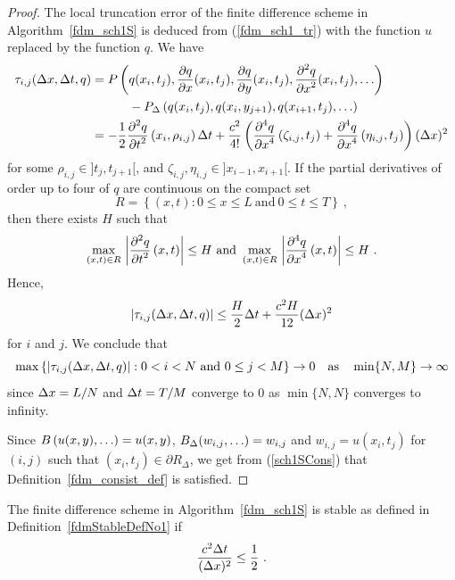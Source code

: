 \begin{proof}
The local truncation error of the finite difference scheme in
Algorithm~\ref{fdm_sch1S} is deduced from (\ref{fdm_sch1_tr}) with the
function $u$ replaced by the function $q$.  We have
\begin{align*}
\tau_{i,j}(\Delta{x},\Delta{t},q) &= 
P\left(q(x_i,t_j), \frac{\partial{q}}{\partial{x}}(x_i,t_j), \frac{\partial{q}}{\partial{y}}(x_i,t_j),
  \frac{\displaystyle \partial^{2}{q}} {\displaystyle \partial{x}^{2}}(x_i,t_j), \ldots \right) \\
&\qquad\quad
- P_\Delta\left(q(x_i,t_j), q(x_i,y_{j+1}), q(x_{i+1},t_j), \ldots\right) \\
&= -\frac{1}{2} \frac{\displaystyle \partial^{2}{q}} {\displaystyle \partial{t}^{2}}\left(x_i,\rho_{i,j}\right) \Delta{t}
+ \frac{c^2}{4!} \left( \frac{\displaystyle \partial^{4}{q}} {\displaystyle \partial{x}^{4}}\left(\zeta_{i,j},t_j\right)
+ \frac{\displaystyle \partial^{4}{q}} {\displaystyle \partial{x}^{4}}\left(\eta_{i,j},t_j\right) \right) (\Delta{x})^2
\end{align*}
for some $\rho_{i,j} \in ]t_j,t_{j+1}[$, and
$\zeta_{i,j}, \eta_{i,j} \in ]x_{i-1},x_{i+1}[$.  If the partial
derivatives of order up to four of $q$ are continuous on the compact set
\begin{equation} \label{fdm_sch1_dom}
R = \left\{ (x,t) : 0\leq x \leq L \ \text{and}\ 0 \leq t \leq T \right\} \ ,
\end{equation}
then there exists $H$ such that
\[
\max_{(x,t)\in R}\, \left|\frac{\displaystyle \partial^{2}{q}} {\displaystyle \partial{t}^{2}}\left(x,t\right) \right| \leq
H \ \text{and} \
\max_{(x,t)\in R}\, \left|\frac{\displaystyle \partial^{4}{q}} {\displaystyle \partial{x}^{4}}\left(x,t\right) \right| \leq
H \ .
\]
Hence,
\begin{equation}\label{fdm_sch1Trunc}
\left| \tau_{i,j}(\Delta{x},\Delta{t},q) \right | \leq
\frac{H}{2} \Delta{t} + \frac{c^2 H}{12} (\Delta{x})^2
\end{equation}
for $i$ and $j$.  We conclude that
\begin{equation} \label{sch1SCons}
\max \left\{ \left|\tau_{i,j}(\Delta{x},\Delta{t},q)\right| :
0<i<N \ \text{and} \ 0\leq j < M
\right\} \rightarrow 0 \quad \text{as} \quad
\min \{N, M\} \rightarrow \infty
\end{equation}
since $\Delta{x} = L/N$ and $\Delta{t} = T/M$ converge to $0$ as
$\min\{N,N\}$ converges to infinity.

Since $\displaystyle B\left(u(x,y), \ldots \right) = u(x,y)$,
$\displaystyle B_\Delta(w_{i,j},\ldots) = w_{i,j}$ and $w_{i,j} = u(x_i,t_j)$
for $(i,j)$ such that $(x_i,t_j) \in \partial R_\Delta$, we get from 
(\ref{sch1SCons}) that Definition~\ref{fdm_consist_def} is satisfied.
\end{proof}

\begin{prop}
The finite difference scheme in Algorithm~\ref{fdm_sch1S} is stable
as defined in Definition~\ref{fdmStableDefNo1} if
\[
\frac{c^2\dtx{t}}{(\dtx{x})^2} \leq \frac{1}{2} \ .
\]
\end{prop}

